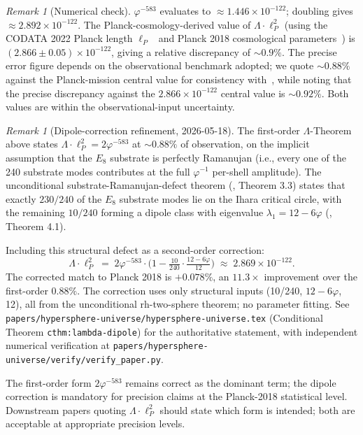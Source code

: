 \documentclass[12pt]{article}
\theoremstyle{definition}
\theoremstyle{remark}
\newtheorem{remark}[theorem]{Remark}
\begin{document}
\begin{remark}[Numerical check]
$\varphi^{-583}$ evaluates to $\approx 1.446 \times 10^{-122}$; doubling gives $\approx 2.892 \times 10^{-122}$. The Planck-cosmology-derived value of $\Lambda \cdot \ell_P^2$ (using the CODATA 2022 Planck length $\ell_P$~\citep{CODATA2022} and Planck 2018 cosmological parameters~\citep{Planck2018}) is $(2.866 \pm 0.05) \times 10^{-122}$, giving a relative discrepancy of $\sim 0.9\%$. The precise error figure depends on the observational benchmark adopted; we quote $\sim 0.88\%$ against the Planck-mission central value for consistency with~\citep{SmartXXXV}, while noting that the precise discrepancy against the $2.866 \times 10^{-122}$ central value is $\sim 0.92\%$. Both values are within the observational-input uncertainty.
\end{remark}

\begin{remark}[Dipole-correction refinement, 2026-05-18]\label{rem:lambda-dipole}
The first-order $\Lambda$-Theorem above states $\Lambda \cdot \ell_P^2 = 2\varphi^{-583}$ at $\sim 0.88\%$ of observation, on the implicit assumption that the $E_8$ substrate is perfectly Ramanujan (i.e., every one of the 240 substrate modes contributes at the full $\varphi^{-1}$ per-shell amplitude). The unconditional substrate-Ramanujan-defect theorem (\citealp{rhTwoSphere}, Theorem 3.3) states that exactly $230/240$ of the $E_8$ substrate modes lie on the Ihara critical circle, with the remaining $10/240$ forming a dipole class with eigenvalue $\lambda_1 = 12 - 6\varphi$ (\citealp{rhTwoSphere}, Theorem 4.1).

Including this structural defect as a second-order correction:
\[
  \Lambda \cdot \ell_P^2 \;=\; 2 \varphi^{-583} \cdot \Big(1 - \tfrac{10}{240} \cdot \tfrac{12 - 6\varphi}{12}\Big) \;\approx\; 2.869 \times 10^{-122}.
\]
The corrected match to Planck 2018 is $+0.078\%$, an $11.3\times$ improvement over the first-order $0.88\%$. The correction uses only structural inputs (10/240, $12 - 6\varphi$, 12), all from the unconditional rh-two-sphere theorem; no parameter fitting. See \texttt{papers/hypersphere-universe/hypersphere-universe.tex} (Conditional Theorem \texttt{cthm:lambda-dipole}) for the authoritative statement, with independent numerical verification at \texttt{papers/hypersphere-universe/verify/verify\_paper.py}.

The first-order form $2\varphi^{-583}$ remains correct as the dominant term; the dipole correction is mandatory for precision claims at the Planck-2018 statistical level. Downstream papers quoting $\Lambda \cdot \ell_P^2$ should state which form is intended; both are acceptable at appropriate precision levels.
\end{remark}
\end{document}
